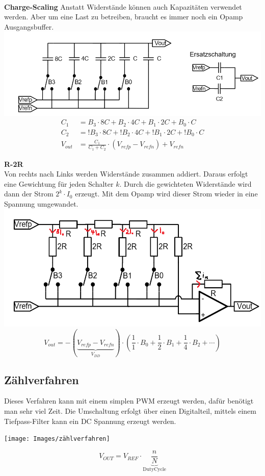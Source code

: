 ~\\
\textbf{Charge-Scaling}
Anstatt Widerstände können auch Kapazitäten verwendet werden. Aber um eine Last zu betreiben, braucht es immer noch ein Opamp Ausgangsbuffer.\\
\includegraphics[width=\columnwidth]{Images/chargescaling}
\begin{align*}
	C_1 &= B_3\cdot 8C + B_2\cdot4C + B_1\cdot2C + B_0\cdot C\\	
	C_2 &= !B_3\cdot 8C + !B_2\cdot4C + !B_1\cdot2C + !B_0\cdot C\\
	V_{out} &= \frac{C_1}{C_1 + C_2}\cdot (V_{refp} - V_{refn}) +V_{refn}
\end{align*}

\textbf{R-2R}\\
Von rechts nach Links werden Widerstände zusammen addiert. Daraus erfolgt eine Gewichtung für jeden Schalter $k$. Durch die gewichteten Widerstände wird dann der Strom $2^k\cdot I_0$ erzeugt. Mit dem Opamp wird dieser Strom wieder in eine Spannung umgewandet.
\includegraphics[width=\linewidth]{Images/r-2r}
\[
V_{out} = -(\underbrace{V_{refp} - V_{refn}}_{V_{DD}})\cdot \left(\frac{1}{1}\cdot B_0 + \frac{1}{2}\cdot B_1+ \frac{1}{4}\cdot B_2 + \cdots\right)
\]

\subsection{Zählverfahren}
Dieses Verfahren kann mit einem simplen PWM erzeugt werden, dafür benötigt man sehr viel Zeit. Die Umschaltung erfolgt über einen Digitalteil, mittels einem Tiefpass-Filter kann ein DC Spannung erzeugt werden. 
\begin{center}
	\texttt{[image: Images/zählverfahren]}
\end{center}
\[
V_{OUT} = V_{REF}\cdot\underbrace{\frac{n}{N}}_\text{DutyCycle}
\]

